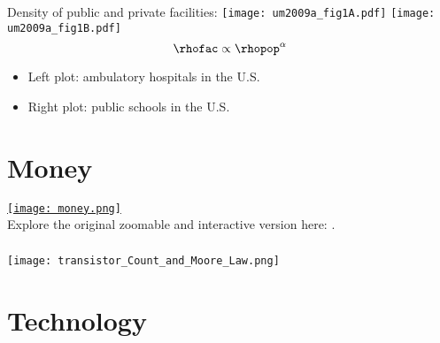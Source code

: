 \begin{frame}

  \begin{block}{Density of public and private facilities:}
    \texttt{[image: um2009a\_fig1A.pdf]}
    \texttt{[image: um2009a\_fig1B.pdf]}
    $$
    \rhofac \propto \rhopop^{\alpha} 
    $$    
    \begin{itemize}
    \item<1->
      \alert{Left plot:} ambulatory hospitals in the U.S.
    \item<1-> 
      \alert{Right plot:} public schools in the U.S.
    \end{itemize}
  \end{block}

\end{frame}

\section{Money}

\begin{frame}
  
  \href{http://xkcd.com/980/}{
    \texttt{[image: money.png]}
  }\\
  Explore the original zoomable and  interactive version here: 
  .

\end{frame}

\begin{frame}
  \frametitle{}

  \begin{block}{}
    \texttt{[image: transistor\_Count\_and\_Moore\_Law.png]}
  \end{block}

\end{frame}

\section{Technology}

